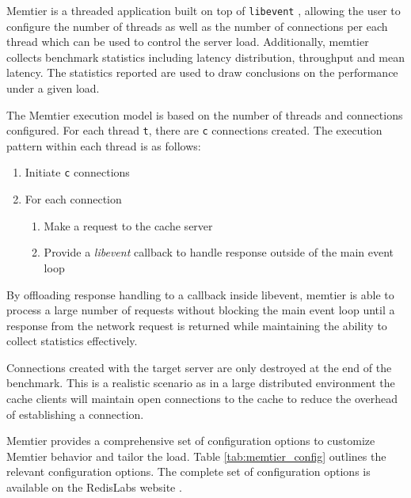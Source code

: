 Memtier is a threaded application built on top of \texttt{libevent} \cite{libevent}, allowing the user to configure the number of threads as well as the number of connections per each thread which can be used to control the server load. Additionally, memtier collects benchmark statistics including latency distribution, throughput and mean latency. The statistics reported are used to draw conclusions on the performance under a given load.

The Memtier execution model is based on the number of threads and connections configured. For each thread \texttt{t}, there are \texttt{c} connections created. The execution pattern within each thread is as follows:

\begin{enumerate}
    \item Initiate \texttt{c} connections
    \item For each connection
        \begin{enumerate}
            \item Make a request to the cache server
            \item Provide a \textit{libevent} callback to handle response outside of the main event loop
        \end{enumerate}
\end{enumerate}

By offloading response handling to a callback inside libevent, memtier is able to process a large number of requests without blocking the main event loop until a response from the network request is returned while maintaining the ability to collect statistics effectively.

Connections created with the target server are only destroyed at the end of the benchmark. This is a realistic scenario as in a large distributed environment the cache clients will maintain open connections to the cache to reduce the overhead of establishing a connection.

Memtier provides a comprehensive set of configuration options to customize Memtier behavior and tailor the load. Table \ref{tab:memtier_config} outlines the relevant configuration options. The complete set of configuration options is available on the RedisLabs website \cite{MemtierConfiguration}.


